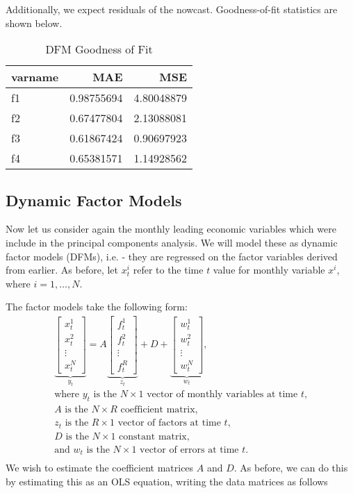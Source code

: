 \documentclass[11pt, letterpaper]{article}\usepackage[]{graphicx}\usepackage[]{color}
\begin{document}
Additionally, we expect residuals of the nowcast. Goodness-of-fit statistics are shown below.
\begin{table}[H]
\centering
\begingroup\footnotesize
\begin{tabular}{lrr}
  \hline
varname & MAE & MSE \\ 
  \hline
f1 & 0.98755694 & 4.80048879 \\ 
  f2 & 0.67477804 & 2.13088081 \\ 
  f3 & 0.61867424 & 0.90697923 \\ 
  f4 & 0.65381571 & 1.14928562 \\ 
   \hline
\end{tabular}
\endgroup
\caption{DFM Goodness of Fit} 
\end{table}




\subsection{Dynamic Factor Models}
Now let us consider again the monthly leading economic variables which were include in the principal components analysis. We will model these as dynamic factor models (DFMs), i.e. - they are regressed on the factor variables derived from earlier. As before, let $x^i_t$ refer to the time $t$ value for monthly variable $x^i$, where $i = 1, \dots, N$.

The factor models take the following form:
\begin{align*}
\underbrace{\begin{bmatrix}
	x^1_t\\
	x^2_t\\
	\vdots \\
	x^N_t
\end{bmatrix}}_{y_t}
=
A
\underbrace{\begin{bmatrix}
	f^1_{t}\\
	f^2_{t}\\
	\vdots \\
	f^R_{t}
\end{bmatrix}}_{z_t}
+
D 
+
\underbrace{\begin{bmatrix}
	w^1_t\\
	w^2_t\\
	\vdots\\
	w^N_t
\end{bmatrix}}_{w_t},\\
\text{where $y_t$ is the $N \times 1$ vector of monthly variables at time $t$,}\\
\text{$A$ is the $N \times R$ coefficient matrix,}\\
\text{$z_t$ is the $R \times 1$ vector of factors at time $t$,}\\
\text{$D$ is the $N \times 1$ constant matrix,}\\
\text{and $w_t$ is the $N \times 1$ vector of errors at time $t$.}\\
\end{align*}
We wish to estimate the coefficient matrices $A$ and $D$. As before, we can do this by estimating this as an OLS equation, writing the data matrices as follows
\end{document}
